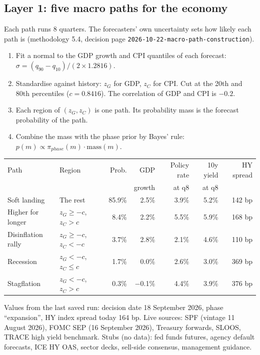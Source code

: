 \documentclass[10pt,a4paper]{article}
\begin{document}
\subsection{Layer 1: five macro paths for the economy}
Each path runs 8 quarters. The forecasters' own uncertainty sets how likely each path is (methodology 5.4, decision page \texttt{2026-10-22-macro-path-construction}).
\begin{enumerate}
\item Fit a normal to the GDP growth and CPI quantiles of each forecast: $\sigma = (q_{90}-q_{10})/(2\times1.2816)$.
\item Standardise against history: $z_G$ for GDP, $z_C$ for CPI. Cut at the 20th and 80th percentiles ($c = 0.8416$). The correlation of GDP and CPI is $-0.2$.
\item Each region of $(z_G, z_C)$ is one path. Its probability mass is the forecast probability of the path.
\item Combine the mass with the phase prior by Bayes' rule: $p(m) \propto \pi_{phase}(m)\cdot\text{mass}(m)$.
\end{enumerate}
\begin{center}
\begin{tabular}{lP{5.2cm}rrrrr}
\toprule
Path & Region & Prob. & GDP & Policy rate & 10y yield & HY spread \\
 & & & growth & at q8 & at q8 & \\\midrule
Soft landing & The rest & 85.9\% & 2.5\% & 3.9\% & 5.2\% & 142 bp \\
Higher for longer & $z_G \ge -c$, $z_C > c$ & 8.4\% & 2.2\% & 5.5\% & 5.9\% & 168 bp \\
Disinflation rally & $z_G \ge -c$, $z_C < -c$ & 3.7\% & 2.8\% & 2.1\% & 4.6\% & 110 bp \\
Recession & $z_G < -c$, $z_C \le c$ & 1.7\% & 0.0\% & 2.6\% & 3.0\% & 369 bp \\
Stagflation & $z_G < -c$, $z_C > c$ & 0.3\% & $-$0.1\% & 4.4\% & 3.9\% & 376 bp \\
\bottomrule
\end{tabular}
\end{center}
Values from the last saved run: decision date 18 September 2026, phase ``expansion'', HY index spread today 164 bp. Live sources: SPF (vintage 11 August 2026), FOMC SEP (16 September 2026), Treasury forwards, SLOOS, TRACE high yield benchmark. Stubs (no data): fed funds futures, agency default forecasts, ICE HY OAS, sector decks, sell-side consensus, management guidance.
\end{document}
